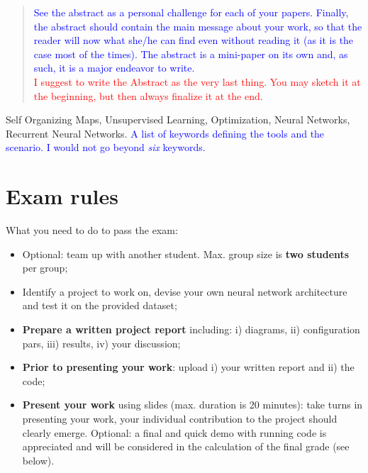 \documentclass[10pt, conference, letterpaper]{IEEEtran}
\newcommand\MR[1]{\textcolor{blue}{#1}}
\newcommand\red[1]{\textcolor{red}{#1}}
\begin{document}
\begin{abstract}
\MR{See the abstract as a personal challenge for each of your papers. Finally, the abstract should contain the main message about your work, so that the reader will now what she/he can find even without reading it (as it is the case most of the times). The abstract is a mini-paper on its own and, as such, it is a major endeavor to write.}\\ 

\red{I suggest to write the Abstract as the very last thing. You may sketch it at the beginning, but then always finalize it at the end.}
\end{abstract}

\IEEEkeywords
Self Organizing Maps, Unsupervised Learning, Optimization, Neural Networks, Recurrent Neural Networks. \MR{A list of keywords defining the tools and the scenario. I would not go beyond {\it six} keywords.}
\endIEEEkeywords












\section{Exam rules}

What you need to do to pass the exam:
\begin{itemize}
\item Optional: team up with another student. Max. group size is \textbf{two students} per group;
\item Identify a project to work on, devise your own neural network architecture and test it on the provided dataset;
\item \textbf{Prepare a written project report} including: i) diagrams, ii) configuration pars, iii) results, iv) your discussion;
\item \textbf{Prior to presenting your work}: upload i) your written report and ii) the code;
\item \textbf{Present your work} using slides (max. duration is 20 minutes): take turns in presenting your work, your individual contribution to the project should clearly emerge. Optional: a final and quick demo with running code is appreciated and will be considered in the calculation of the final grade (see below). 
\end{itemize}
\end{document}
